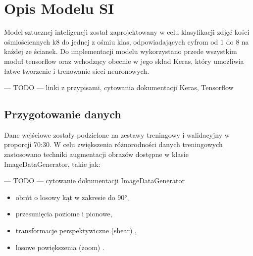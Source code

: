 \section{Opis Modelu SI}\label{sec:opis-modelu-si}

Model sztucznej inteligencji został zaprojektowany w celu klasyfikacji zdjęć kości ośmiościennych k8 do jednej z ośmiu klas,
odpowiadających cyfrom od 1 do 8 na każdej ze ścianek.
Do implementacji modelu wykorzystano przede wszystkim moduł tensorflow oraz wchodzący obecnie w jego skład Keras,
który umożliwia łatwe tworzenie i trenowanie sieci neuronowych.

--- TODO --- linki z przypisami, cytowania dokumentacji Keras, Tensorflow



\subsection{Przygotowanie danych}\label{subsec:przygotowanie-danych}

Dane wejściowe zostały podzielone na zestawy treningowy i walidacyjny w proporcji 70:30.
W celu zwiększenia różnorodności danych treningowych zastosowano techniki augmentacji obrazów dostępne w klasie ImageDataGenerator, takie jak:

--- TODO --- cytowanie dokumentacji ImageDataGenerator

\begin{itemize}
    \item obrót o losowy kąt w zakresie do 90°,
    \item przesunięcia poziome i pionowe,
    \item transformacje perspektywiczne (shear) ,
    \item losowe powiększenia (zoom) .
\end{itemize}

\iffalse

